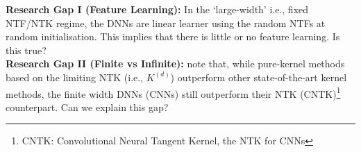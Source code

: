 \textbf{Research Gap I (Feature Learning):} In the `large-width' i.e., fixed NTF/NTK regime, the DNNs are linear learner using the random NTFs at random initialisation. This implies that there is little or no feature learning. Is this true?\\
\textbf{Research Gap II (Finite vs Infinite):} \cite{arora2019exact} note that, while pure-kernel methods based on the limiting NTK (i.e., $K^{(d)}$) outperform other state-of-the-art kernel methods, the finite width DNNs (CNNs) still outperform their NTK (CNTK)\footnote{CNTK: Convolutional Neural Tangent Kernel, the NTK for CNNs} counterpart. Can we explain this gap?
\begin{comment}
\subsection{Contributions}
$\bullet$ (\Cref{sec:pathgate}) Central idea in this paper is the 'path-view', wherein, we decompose the computation in such DNNs into paths and gate. Intuitively speaking, when a particular example is presented to the network only a sub-set of the activations \emph{on} and the output is obtained as the sum of the contribution of the various paths in the sub-network formed by such \emph{on} gates. We explicitly encode the state of the gates in a novel \emph{neural path feature} (NPFs), which is zeroth-order feature. 
Using the `path-view', we  encode the state of the gates in a novel \emph{neural path feature} (NPFs), and the weights in a novel \emph{neural path value} (NPV), and express the output as an inner product of the NPV and NPF. This reveals the presence to learning problems namely i) learning NPVs for fixed NPFs and ii) learning NPFs themselves.\\
Using the `path-view' we characterise the information flow via two different sub-networks, i) of active gates which are on and ii) of sensitive gates which are on the verge of turning on or off. 
$\bullet$ (\Cref{sec:kernel}) We also show the NTK can be decomposed into $K_{\Theta}=K^v_{\Theta}+K^{\phi}_{\Theta}+K^{cross}_{\Theta}$, where $K^v_{\Theta}$ is the NTK of values responsible for optimisation with fixed features, and $K^{\phi}_{\Theta}$ is the NTK of features responsible for feature learning, and $K^{cross}_{\Theta}$ is a symmetric matrix of cross terms. \\
$\bullet$ (\Cref{sec:optimisation})We study a novel fixed NPF regime. Here, we show that as width increases to infinity the optimisation and generalisation properties are captured by the \emph{neural path kernel} (NPK), the kernel associated with the NPFs. In the case of finite width,  we show that when optimising  using GD i) increasing depth till a point helps in training and ii) increasing depth beyond a point hurts training.\\
$\bullet$ (\Cref{sec:generalisation}) We show via experiments, that NPFs are learnt during training, and such learning improves generalisation performance.
\end{comment}